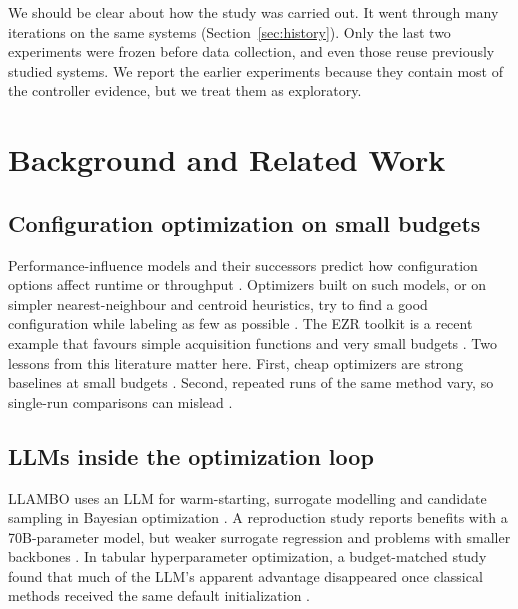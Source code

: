 We should be clear about how the study was carried out. It went through many iterations on the same systems (Section~\ref{sec:history}). Only the last two experiments were frozen before data collection, and even those reuse previously studied systems. We report the earlier experiments because they contain most of the controller evidence, but we treat them as exploratory.

\section{Background and Related Work}

\subsection{Configuration optimization on small budgets}

Performance-influence models and their successors predict how configuration options affect runtime or throughput \cite{siegmund2015influence,ha2019deepperf}. Optimizers built on such models, or on simpler nearest-neighbour and centroid heuristics, try to find a good configuration while labeling as few as possible \cite{nair2020flash,menzies2026ezr}. The EZR toolkit is a recent example that favours simple acquisition functions and very small budgets \cite{menzies2026ezr}. Two lessons from this literature matter here. First, cheap optimizers are strong baselines at small budgets \cite{ganguly2026tournament}. Second, repeated runs of the same method vary, so single-run comparisons can mislead \cite{rayegan2026instability}.

\subsection{LLMs inside the optimization loop}

LLAMBO uses an LLM for warm-starting, surrogate modelling and candidate sampling in Bayesian optimization \cite{liu2024llambo}. A reproduction study reports benefits with a 70B-parameter model, but weaker surrogate regression and problems with smaller backbones \cite{rychert2025reproduction}. In tabular hyperparameter optimization, a budget-matched study found that much of the LLM's apparent advantage disappeared once classical methods received the same default initialization \cite{rodrigues2026worth}.


